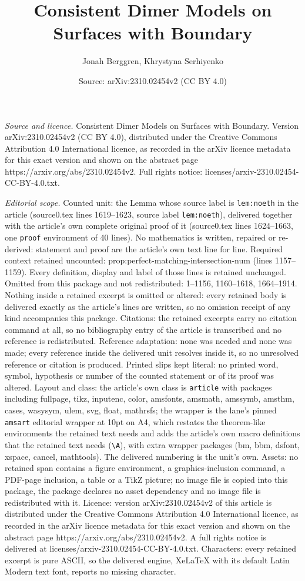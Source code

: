 \documentclass[10pt,a4paper]{amsart}
\title[Consistent Dimer Models on Surfaces with Boundary]{Consistent Dimer Models on Surfaces with Boundary}
\author{Jonah Berggren, Khrystyna Serhiyenko}
\date{Source: arXiv:2310.02454v2 (CC BY 4.0)}
\begin{document}
\maketitle

\noindent\emph{Source and licence.} Consistent Dimer Models on Surfaces with Boundary. Version arXiv:2310.02454v2 (CC BY 4.0), distributed under the Creative Commons Attribution 4.0 International licence, as recorded in the arXiv licence metadata for this exact version and shown on the abstract page https://arxiv.org/abs/2310.02454v2. Full rights notice: licenses/arxiv-2310.02454-CC-BY-4.0.txt.\par\smallskip

\noindent\textit{Editorial scope.} Counted unit: the Lemma whose source label is \texttt{lem:noeth} in the article (source0.tex lines 1619--1623, source label \texttt{lem:noeth}), delivered together with the article's own complete original proof of it (source0.tex lines 1624--1663, one \texttt{proof} environment of 40 lines). No mathematics is written, repaired or re-derived: statement and proof are the article's own text line for line. Required context retained uncounted: prop:perfect-matching-intersection-num (lines 1157--1159). Every definition, display and label of those lines is retained unchanged. Omitted from this package and not redistributed: 1--1156, 1160--1618, 1664--1914. Nothing inside a retained excerpt is omitted or altered: every retained body is delivered exactly as the article's lines are written, so no omission receipt of any kind accompanies this package. Citations: the retained excerpts carry no citation command at all, so no bibliography entry of the article is transcribed and no reference is redistributed. Reference adaptation: none was needed and none was made; every reference inside the delivered unit resolves inside it, so no unresolved reference or citation is produced. Printed slips kept literal: no printed word, symbol, hypothesis or number of the counted statement or of its proof was altered. Layout and class: the article's own class is \texttt{article} with packages including fullpage, tikz, inputenc, color, amsfonts, amsmath, amssymb, amsthm, cases, wasysym, ulem, svg, float, mathrsfs; the wrapper is the lane's pinned \texttt{amsart} editorial wrapper at 10pt on A4, which restates the theorem-like environments the retained text needs and adds the article's own macro definitions that the retained text needs (\texttt{\textbackslash A}), with extra wrapper packages (bm, bbm, dsfont, xspace, cancel, mathtools). The delivered numbering is the unit's own. Assets: no retained span contains a figure environment, a graphics-inclusion command, a PDF-page inclusion, a table or a TikZ picture; no image file is copied into this package, the package declares no asset dependency and no image file is redistributed with it. Licence: version arXiv:2310.02454v2 of this article is distributed under the Creative Commons Attribution 4.0 International licence, as recorded in the arXiv licence metadata for this exact version and shown on the abstract page https://arxiv.org/abs/2310.02454v2. A full rights notice is delivered at licenses/arxiv-2310.02454-CC-BY-4.0.txt. Characters: every retained excerpt is pure ASCII, so the delivered engine, XeLaTeX with its default Latin Modern text font, reports no missing character.
\end{document}
